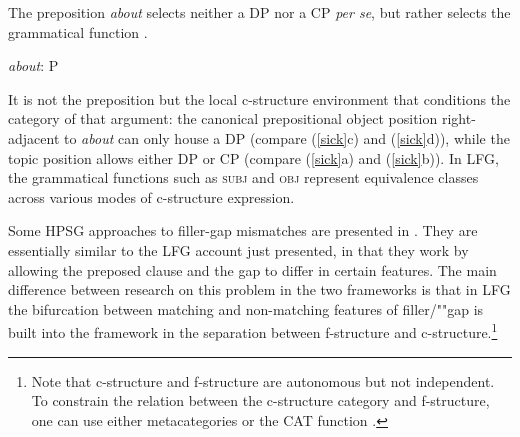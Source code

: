 \zl
The preposition \textit{about} selects neither a DP nor a CP \textit{per se}, but rather selects the grammatical function  .

\eal \label{talk-about}
{\textit{about}\/: P}\qquad{}    
\zl


\noindent
It is not the preposition but the local c-structure environment that conditions the category of that argument: the canonical prepositional object position right-adjacent to \textit{about} can only house a DP (compare (\ref{sick}c) and (\ref{sick}d)), while the topic position allows either DP or CP (compare (\ref{sick}a) and (\ref{sick}b)).  In LFG, the grammatical functions such as \textsc{subj} and \textsc{obj} represent equivalence classes across various modes of c-structure expression.  

Some HPSG approaches to filler-gap mismatches are presented in .  They are essentially similar to the LFG account just presented, in that they work by allowing the preposed clause and the gap to differ in certain features.  The main difference between research on this problem in the two frameworks is that in LFG the bifurcation between matching and non-matching features of filler/""gap  is built into the framework in the separation between f-structure and c-structure.\footnote{Note that c-structure and f-structure are autonomous but not independent.  To constrain the relation between the c-structure category and f-structure, one can use either metacategories \citep[691--698]{dalrymple;ea19} or the CAT function \citep[265]{dalrymple;ea19}.}  



